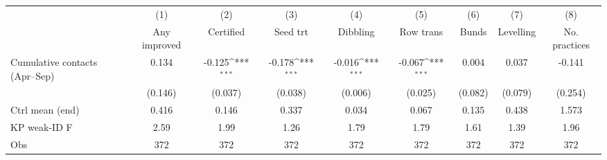 {
\def\sym#1{\ifmmode^{#1}\else\(^{#1}\)\fi}
\begin{tabular}{l*{8}{c}}
\toprule
                    &\multicolumn{1}{c}{(1)}&\multicolumn{1}{c}{(2)}&\multicolumn{1}{c}{(3)}&\multicolumn{1}{c}{(4)}&\multicolumn{1}{c}{(5)}&\multicolumn{1}{c}{(6)}&\multicolumn{1}{c}{(7)}&\multicolumn{1}{c}{(8)}\\
                    &\multicolumn{1}{c}{Any improved}&\multicolumn{1}{c}{Certified}&\multicolumn{1}{c}{Seed trt}&\multicolumn{1}{c}{Dibbling}&\multicolumn{1}{c}{Row trans}&\multicolumn{1}{c}{Bunds}&\multicolumn{1}{c}{Levelling}&\multicolumn{1}{c}{No. practices}\\
\midrule
Cumulative contacts (Apr--Sep)&       0.134         &      -0.125\sym{***}&      -0.178\sym{***}&      -0.016\sym{***}&      -0.067\sym{***}&       0.004         &       0.037         &      -0.141         \\
                    &     (0.146)         &     (0.037)         &     (0.038)         &     (0.006)         &     (0.025)         &     (0.082)         &     (0.079)         &     (0.254)         \\
\midrule
Ctrl mean (end)     &       0.416         &       0.146         &       0.337         &       0.034         &       0.067         &       0.135         &       0.438         &       1.573         \\
KP weak-ID F        &        2.59         &        1.99         &        1.26         &        1.79         &        1.79         &        1.61         &        1.39         &        1.96         \\
Obs                 &         372         &         372         &         372         &         372         &         372         &         372         &         372         &         372         \\
\bottomrule
\end{tabular}
}
